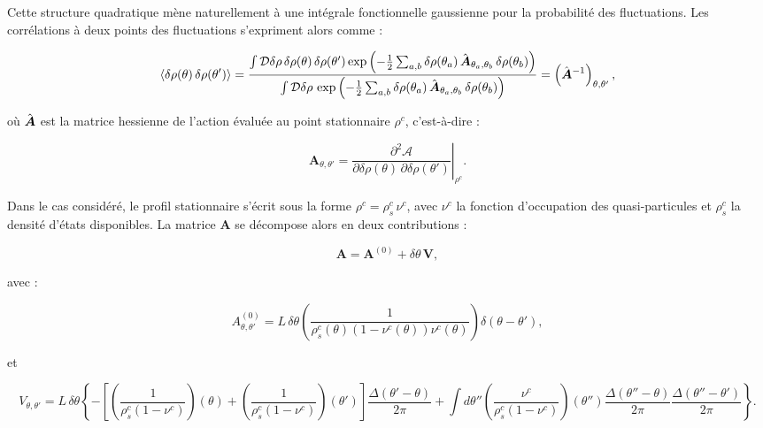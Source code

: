 Cette structure quadratique mène naturellement à une intégrale fonctionnelle gaussienne pour la probabilité des fluctuations. Les corrélations à deux points des fluctuations s’expriment alors comme :

\begin{equation*}
    \langle \delta \rho(\theta) \, \delta \rho(\theta') \rangle 
    =  
    \frac{ \int \mathcal{D} \delta \rho \, \delta \rho(\theta) \, \delta \rho(\theta') 
    \exp\left( -\frac{1}{2} \sum_{a,b} \delta \rho(\theta_a) \, 
    \hat{\bm{A}}_{\theta_a, \theta_b} \, \delta \rho(\theta_b) \right) }
    { \int \mathcal{D} \delta \rho \, 
    \exp\left( -\frac{1}{2} \sum_{a,b} \delta \rho(\theta_a) \, 
    \hat{\bm{A}}_{\theta_a, \theta_b} \, \delta \rho(\theta_b) \right) } 
    = \left( \hat{\bm{A}}^{-1} \right)_{\theta, \theta'},
\end{equation*}

où \( \hat{\bm{A}} \) est la matrice hessienne de l’action évaluée au point stationnaire \( \rho^c \), c’est-à-dire :

\begin{equation*}
    \mathbf{A}_{\theta, \theta'} = \left. 
    \frac{\partial^2 \mathcal{A}}{\partial \delta \rho(\theta) \, \partial \delta \rho(\theta')} 
    \right|_{\rho^c}.
\end{equation*}

Dans le cas considéré, le profil stationnaire s’écrit sous la forme \( \rho^c = \rho^c_s \, \nu^c \), avec \( \nu^c \) la fonction d’occupation des quasi-particules et \( \rho^c_s \) la densité d’états disponibles. La matrice \( \mathbf{A} \) se décompose alors en deux contributions :

\begin{equation*}
    \mathbf{A} = \mathbf{A}^{(0)} + \delta\theta \, \mathbf{V},
\end{equation*}

avec :

\begin{equation*}
    A^{(0)}_{\theta, \theta'} = 
    L \, \delta\theta \left( \frac{1}{\rho^c_s(\theta) (1 - \nu^c(\theta)) \nu^c(\theta)} \right) 
    \delta(\theta - \theta'), 
\end{equation*}

et

\begin{equation*}
    V_{\theta, \theta'} = L \, \delta\theta \left\{ 
    - \left[ 
    \left( \frac{1}{\rho^c_s(1 - \nu^c)} \right)(\theta) 
    + \left( \frac{1}{\rho^c_s(1 - \nu^c)} \right)(\theta') 
    \right] \frac{\Delta(\theta' - \theta)}{2\pi} \right. 
    + \left. \int d\theta'' 
    \left( \frac{\nu^c}{\rho^c_s (1 - \nu^c)} \right)(\theta'') 
    \frac{\Delta(\theta'' - \theta)}{2\pi} 
    \frac{\Delta(\theta'' - \theta')}{2\pi} \right\}.
\end{equation*}

